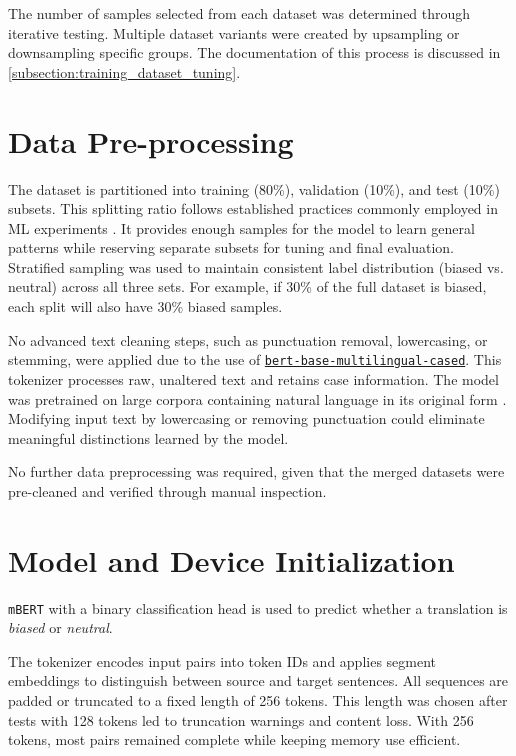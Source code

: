 The number of samples selected from each dataset was determined through iterative testing. Multiple dataset variants were created by upsampling or downsampling specific groups. The documentation of this process is discussed in \autoref{subsection:training_dataset_tuning}.

\section{Data Pre-processing}
    The dataset is partitioned into training (80\%), validation (10\%), and test (10\%) subsets. This splitting ratio follows established practices commonly employed in ML experiments \parencite{bahetiTrainTestValidation2021}. It provides enough samples for the model to learn general patterns while reserving separate subsets for tuning and final evaluation. Stratified sampling was used to maintain consistent label distribution (biased vs. neutral) across all three sets. For example, if 30\% of the full dataset is biased, each split will also have 30\% biased samples. 

    No advanced text cleaning steps, such as punctuation removal, lowercasing, or stemming, were applied due to the use of \href{https://huggingface.co/google-bert/bert-base-multilingual-cased}{\texttt{bert-base-multilingual-cased}}. This tokenizer processes raw, unaltered text and retains case information. The model was pretrained on large corpora containing natural language in its original form \parencite{devlinBERTPretrainingDeep2019}. Modifying input text by lowercasing or removing punctuation could eliminate meaningful distinctions learned by the model. 

    No further data preprocessing was required, given that the merged datasets were pre-cleaned and verified through manual inspection.

\section{Model and Device Initialization}
    \texttt{mBERT} with a binary classification head is used to predict whether a translation is \textit{biased} or \textit{neutral}.

    The tokenizer encodes input pairs into token IDs and applies segment embeddings to distinguish between source and target sentences. All sequences are padded or truncated to a fixed length of 256 tokens. This length was chosen after tests with 128 tokens led to truncation warnings and content loss. With 256 tokens, most pairs remained complete while keeping memory use efficient.


